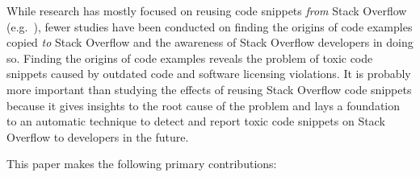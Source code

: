\documentclass[10pt,journal,compsoc]{IEEEtran}
\begin{document}

While research has mostly focused on reusing code snippets \emph{from} Stack
Overflow (e.g.~\cite{Keivanloo2014,An2017,Yang2016}), fewer studies have been
conducted on finding the origins of code examples copied \emph{to} Stack
Overflow and the awareness of Stack Overflow developers in doing so. Finding the
origins of code examples reveals the problem of toxic code snippets
caused by outdated code and software licensing violations. It is probably more
important than studying the effects of reusing Stack Overflow code snippets
because it gives insights to the root cause of the problem and lays a
foundation to an automatic technique to detect and report
toxic code snippets on Stack Overflow to developers in the future.

This paper makes the following primary contributions:
\end{document}

